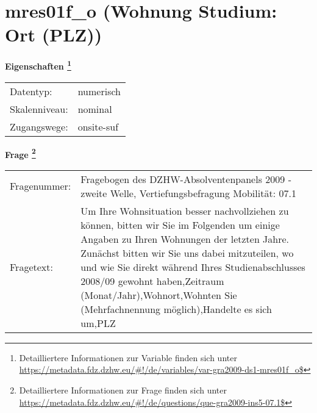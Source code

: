 
    \setcounter{footnote}{0}

    \vspace*{-1.8cm}
	\section{mres01f\_o (Wohnung Studium: Ort (PLZ))}
	\label{section:mres01f_o}



    \vspace*{0.5cm}
    \noindent\textbf{Eigenschaften
	\footnote{Detailliertere Informationen zur Variable finden sich unter
		\url{https://metadata.fdz.dzhw.eu/\#!/de/variables/var-gra2009-ds1-mres01f_o$}}}\\
	\begin{tabularx}{\hsize}{@{}lX}
	Datentyp: & numerisch \\
	Skalenniveau: & nominal \\
	Zugangswege: &
	  onsite-suf
 \\
    \end{tabularx}



				\vspace*{0.5cm}
                \noindent\textbf{Frage
	                \footnote{Detailliertere Informationen zur Frage finden sich unter
		              \url{https://metadata.fdz.dzhw.eu/\#!/de/questions/que-gra2009-ins5-07.1$}}}\\
				\begin{tabularx}{\hsize}{@{}lX}
					Fragenummer: &
					  Fragebogen des DZHW-Absolventenpanels 2009 - zweite Welle, Vertiefungsbefragung Mobilität:
					  07.1
 \\
					Fragetext: & Um Ihre Wohnsituation besser nachvollziehen zu können, bitten wir Sie im Folgenden um einige Angaben zu Ihren Wohnungen der letzten Jahre. Zunächst bitten wir Sie uns dabei mitzuteilen, wo und wie Sie direkt während Ihres Studienabschlusses 2008/09 gewohnt haben,Zeitraum (Monat/Jahr),Wohnort,Wohnten Sie (Mehrfachnennung möglich),Handelte es sich um,PLZ \\
				\end{tabularx}





